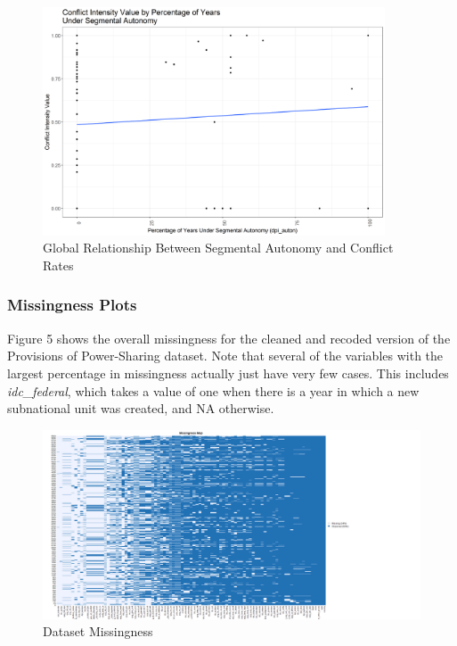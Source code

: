 \documentclass[12pt]{article}
\begin{document}
\begin{figure}[!htbp]
	\begin{center}
		\includegraphics[width = 4in]{csts_ucdp_cumulative_intensity.png}
	\end{center}
	\caption{Global Relationship Between Segmental Autonomy and Conflict Rates}
\end{figure}

\subsubsection{Missingness Plots}

Figure 5 shows the overall missingness for the cleaned and recoded version of the Provisions of Power-Sharing dataset. Note that several of the variables with the largest percentage in missingness actually just have very few cases. This includes \textit{idc\_federal}, which takes a value of one when there is a year in which a new subnational unit was created, and NA otherwise. 

\begin{figure}[!htbp]
	\begin{center}
		\includegraphics[width = 8in]{tjbrailey_psp_clean_missingness.png}
	\end{center}
	\caption{Dataset Missingness}
\end{figure}
\end{document}
